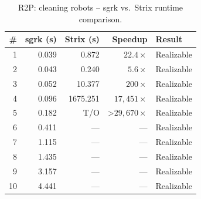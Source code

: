 \begin{table}[htbp]
\centering
\caption{R2P: cleaning robots -- sgrk vs.\ Strix runtime comparison.}
\label{tab:R2P_cleaning_robots}
\begin{tabular}{r r r r l}
\toprule
\# & sgrk (s) & Strix (s) & Speedup & Result \\
\midrule
1 & 0.039 & 0.872 & $22.4\times$ & Realizable \\
2 & 0.043 & 0.240 & $5.6\times$ & Realizable \\
3 & 0.052 & 10.377 & $200\times$ & Realizable \\
4 & 0.096 & 1675.251 & $17,451\times$ & Realizable \\
5 & 0.182 & T/O & >$29,670\times$ & Realizable \\
6 & 0.411 & --- & --- & Realizable \\
7 & 1.115 & --- & --- & Realizable \\
8 & 1.435 & --- & --- & Realizable \\
9 & 3.157 & --- & --- & Realizable \\
10 & 4.441 & --- & --- & Realizable \\
\bottomrule
\end{tabular}
\end{table}
